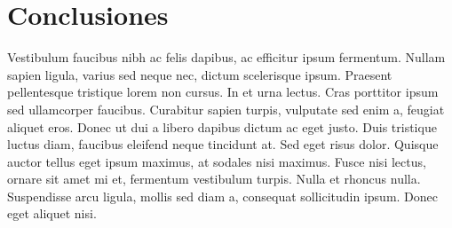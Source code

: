 
\chapter{Conclusiones}


Vestibulum faucibus nibh ac felis dapibus, ac efficitur ipsum fermentum. Nullam sapien ligula, varius sed neque nec, dictum scelerisque ipsum. Praesent pellentesque tristique lorem non cursus. In et urna lectus. Cras porttitor ipsum sed ullamcorper faucibus. Curabitur sapien turpis, vulputate sed enim a, feugiat aliquet eros. Donec ut dui a libero dapibus dictum ac eget justo. Duis tristique luctus diam, faucibus eleifend neque tincidunt at. Sed eget risus dolor. Quisque auctor tellus eget ipsum maximus, at sodales nisi maximus. Fusce nisi lectus, ornare sit amet mi et, fermentum vestibulum turpis. Nulla et rhoncus nulla. Suspendisse arcu ligula, mollis sed diam a, consequat sollicitudin ipsum. Donec eget aliquet nisi.